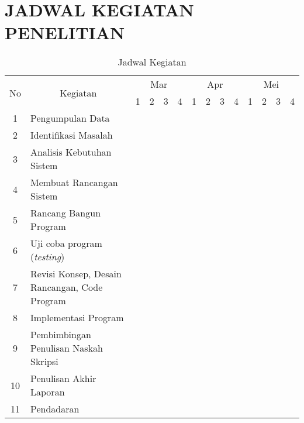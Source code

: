 \chapter*{JADWAL KEGIATAN PENELITIAN}


\begin{table}[!ht]
\caption{Jadwal Kegiatan}
\label{tab:jadwal-kegiatan}
\begin{tabular}{|c|m{5cm}|p{.2cm}|p{.2cm}|p{.2cm}|p{.2cm}|p{.2cm}|p{.2cm}|p{.2cm}|p{.2cm}|p{.2cm}|p{.2cm}|p{.2cm}|p{.2cm}|}
\hline
\multirow{2}{*}{No}	& 
\multicolumn{1}{c|}{\multirow{2}{*}{Kegiatan}}	& 
\multicolumn{4}{c|}{Mar} & 
\multicolumn{4}{c|}{Apr} &
\multicolumn{4}{c|}{Mei} \\ \cline{3-14}
& & 
\multicolumn{1}{c|}{1} &
\multicolumn{1}{c|}{2} &
\multicolumn{1}{c|}{3} &
\multicolumn{1}{c|}{4} &
\multicolumn{1}{c|}{1} &
\multicolumn{1}{c|}{2} &
\multicolumn{1}{c|}{3} &
\multicolumn{1}{c|}{4} &
\multicolumn{1}{c|}{1} &
\multicolumn{1}{c|}{2} &
\multicolumn{1}{c|}{3} &
\multicolumn{1}{c|}{4} \\ \hline
1  & Pengumpulan Data 			& \cellcolor{gray!75} & \cellcolor{gray!75} & & & & & & & & & & \\ \hline
2  & Identifikasi Masalah 		& & & \cellcolor{gray!75} & & & & & & & & & \\ \hline
3  & Analisis Kebutuhan Sistem 	& & \cellcolor{gray!75} & \cellcolor{gray!75} & \cellcolor{gray!75} & & & & & & & & \\ \hline
4  & Membuat Rancangan Sistem 	& & & & \cellcolor{gray!75} & \cellcolor{gray!75} & & & & & & & \\ \hline
5  & Rancang Bangun Program 	& & & & & & \cellcolor{gray!75} & \cellcolor{gray!75} & \cellcolor{gray!75} & & & & \\ \hline
6  & Uji coba program (\textit{testing}) 			& & & & & & & & \cellcolor{gray!75} & \cellcolor{gray!75} & & & \\ \hline
7  & Revisi Konsep, Desain Rancangan, Code Program & & & & & & & & & \cellcolor{gray!75} & \cellcolor{gray!75} & & \\ \hline
8  & Implementasi Program 					& & & & & & & & & & & \cellcolor{gray!75} & \\ \hline
9  & Pembimbingan Penulisan Naskah Skripsi & & & & & \cellcolor{gray!75} & \cellcolor{gray!75} & \cellcolor{gray!75} & \cellcolor{gray!75} & \cellcolor{gray!75} & & & \\ \hline
10 & Penulisan Akhir Laporan 				& & & & & & & & & & \cellcolor{gray!75} & & \\ \hline
11 & Pendadaran 							& & & & & & & & & & & & \cellcolor{gray!75} \\ \hline
\end{tabular}
\end{table}
